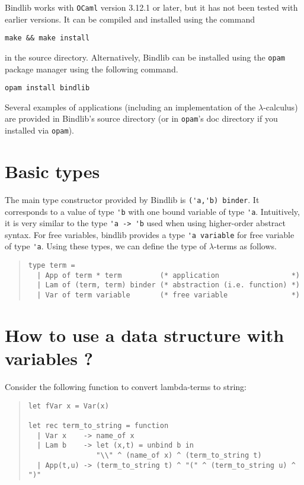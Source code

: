 \documentclass[11pt]{article}
\begin{document}
Bindlib works with \verb#OCaml# version 3.12.1 or later, but it has not been
tested with earlier versions. It can be compiled and installed using the
command
\begin{center}
  \verb#make && make install#
\end{center}
in the source directory. Alternatively, Bindlib can be installed using the
\verb#opam# package manager using the following command.
\begin{center}
  \verb#opam install bindlib#
\end{center}

Several examples of applications (including an implementation of the
$\lambda$-calculus) are provided in Bindlib's source directory (or in
\verb#opam#'s doc directory if you installed via \verb#opam#).

\section{Basic types}

The main type constructor provided by Bindlib is \verb#('a,'b) binder#. It
corresponds to a value of type \verb#'b# with one bound variable of type
\verb#'a#. Intuitively, it is very similar to the type \verb#'a -> 'b# used
when using higher-order abstract syntax. For free variables, bindlib provides
a type \verb#'a variable# for free variable of type \verb#'a#. Using these
types, we can define the type of $\lambda$-terms as follows.
\begin{quote}
\begin{verbatim}
type term =
  | App of term * term         (* application                 *)
  | Lam of (term, term) binder (* abstraction (i.e. function) *)
  | Var of term variable       (* free variable               *)
\end{verbatim}
\end{quote}

\section{How to use a data structure with variables ?}

Consider the following function to convert lambda-terms to string:

\begin{quote}
\begin{verbatim}
let fVar x = Var(x)

let rec term_to_string = function
  | Var x    -> name_of x
  | Lam b    -> let (x,t) = unbind b in
                "\\" ^ (name_of x) ^ (term_to_string t)
  | App(t,u) -> (term_to_string t) ^ "(" ^ (term_to_string u) ^ ")"
\end{verbatim}
\end{quote}
\end{document}
